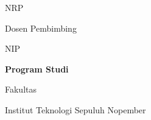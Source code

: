 {\fontsize{14}{17}\selectfont\bfseries \coverdoctypename\par}

\vspace{2\baselineskip}

{\fontsize{18}{22}\selectfont\bfseries\MakeUppercase{\internshiptitle}\par}

\vspace{4\baselineskip}

{\fontsize{14}{17}\selectfont\bfseries\name\par}
{\fontsize{14}{17}\selectfont NRP \nrp\par}

\vspace{3\baselineskip}

{\fontsize{12}{15}\selectfont Dosen Pembimbing\par}
{\fontsize{14}{17}\selectfont\bfseries\advisor\par}
{\fontsize{14}{17}\selectfont NIP \advisornip\par}

\vspace{3\baselineskip}

{\fontsize{14}{17}\selectfont\bfseries Program Studi \studyprogram\par}
{\fontsize{12}{15}\selectfont Fakultas \faculty\par}
{\fontsize{12}{15}\selectfont Institut Teknologi Sepuluh Nopember\par}
{\fontsize{12}{15}\selectfont \place\par}
{\fontsize{12}{15}\selectfont \the\year\par}
